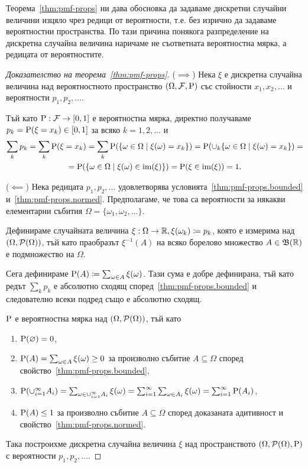 \documentclass[numbers=endperiod, DIV=15, bibliography=totocnumbered]{scrartcl}
\begin{document}
Теорема~\ref{thm:pmf-props} ни дава обосновка да задаваме дискретни случайни величини изцяло чрез редици от вероятности, т.е. без изрично да задаваме вероятностни пространства. По тази причина понякога разпределение на дискретна случайна величина наричаме не съответната вероятностна мярка, а редицата от вероятностите.

\begin{proof}[Доказателство на теорема~\ref{thm:pmf-props}]
  ($\implies$) Нека $\xi$ е дискретна случайна величина над вероятностното пространство $(\Omega, \mathcal{F}, \operatorname{P})$ със стойности $x_1, x_2, \ldots$ и вероятности $p_1, p_2, \ldots$.

  Тъй като $\operatorname{P}: \mathcal{F} \to [0, 1]$ е вероятностна мярка, директно получаваме $p_k = \operatorname{P}(\xi = x_k) \in [0, 1]$ за всяко $k = 1, 2, \ldots$ и
  \begin{multline*}
    \sum_k p_k
    =
    \sum_k \operatorname{P}(\xi = x_k)
    =
    \sum_k \operatorname{P}(\{ \omega \in \Omega \mid \xi(\omega) = x_k \})
    =
    \operatorname{P}(\cup_k \{ \omega \in \Omega \mid \xi(\omega) = x_k \})
    = \\ =
    \operatorname{P}(\{ \omega \in \Omega \mid \xi(\omega) \in \operatorname{im}(\xi) \})
    =
    \operatorname{P}(\xi \in \operatorname{im}(\xi))
    =
    1.
  \end{multline*}

  ($\impliedby$) Нека редицата $p_1, p_2, \ldots$ удовлетворява условията~\ref{thm:pmf-props.bounded} и~\ref{thm:pmf-props.normed}. Предполагаме, че това са вероятности за някакви елементарни събития $\Omega = \{ \omega_1, \omega_2, \ldots \}$.

  Дефинираме случайната величина $\xi: \Omega \to \mathbb{R}, \xi(\omega_k) \coloneqq p_k$, която е измерима над $(\Omega, \mathcal{P}(\Omega))$, тъй като праобразът $\xi^{-1}(A)$ на всяко борелово множество $A \in \mathfrak{B}(\mathbb{R})$ е подмножество на $\Omega$.

  Сега дефинираме $\operatorname{P}(A) \coloneqq \sum_{\omega \in A} \xi(\omega)$. Тази сума е добре дефинирана, тъй като редът $\sum_k p_k$ е абсолютно сходящ според~\ref{thm:pmf-props.bounded} и следователно всеки подред също е абсолютно сходящ.

  $\operatorname{P}$ е вероятностна мярка над $(\Omega, \mathcal{P}(\Omega))$, тъй като
  \begin{enumerate}
    \item $\operatorname{P}(\varnothing) = 0$,
    \item $\operatorname{P}(A) = \sum_{\omega \in A} \xi(\omega) \geq 0$ за произволно събитие $A \subseteq \Omega$ според свойство~\ref{thm:pmf-props.bounded},
    \item $\operatorname{P}(\cup_{i=1}^\infty A_i) = \sum_{\omega \in \cup_{i=1}^\infty A_i} \xi(\omega) = \sum_{i=1}^\infty \sum_{\omega \in A_i} \xi(\omega) = \sum_{i=1}^\infty \operatorname{P}(A_i)$,
    \item $\operatorname{P}(A) \leq 1$ за произволно събитие $A \subseteq \Omega$ според доказаната адитивност и свойство~\ref{thm:pmf-props.normed}.
  \end{enumerate}
  Така построихме дискретна случайна величина $\xi$ над пространството $(\Omega, \mathcal{P}(\Omega), \operatorname{P})$ с вероятности $p_1, p_2, \ldots$.
\end{proof}
\end{document}
